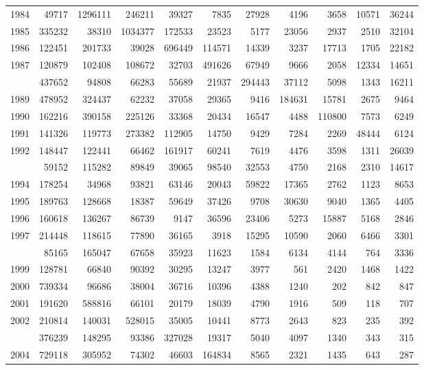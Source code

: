 \documentclass[
]{article}
\begin{document}
\begin{longtable}[t]{lrrrrrrrrrr}
1984 & 49717 & 1296111 & 246211 & 39327 & 7835 & 27928 & 4196 & 3658 & 10571 & 36244\\
1985 & 335232 & 38310 & 1034377 & 172533 & 23523 & 5177 & 23056 & 2937 & 2510 & 32104\\
1986 & 122451 & 201733 & 39028 & 696449 & 114571 & 14339 & 3237 & 17713 & 1705 & 22182\\
1987 & 120879 & 102408 & 108672 & 32703 & 491626 & 67949 & 9666 & 2058 & 12334 & 14651\\
\addlinespace
1988 & 437652 & 94808 & 66283 & 55689 & 21937 & 294443 & 37112 & 5098 & 1343 & 16211\\
1989 & 478952 & 324437 & 62232 & 37058 & 29365 & 9416 & 184631 & 15781 & 2675 & 9464\\
1990 & 162216 & 390158 & 225126 & 33368 & 20434 & 16547 & 4488 & 110800 & 7573 & 6249\\
1991 & 141326 & 119773 & 273382 & 112905 & 14750 & 9429 & 7284 & 2269 & 48444 & 6124\\
1992 & 148447 & 122441 & 66462 & 161917 & 60241 & 7619 & 4476 & 3598 & 1311 & 26039\\
\addlinespace
1993 & 59152 & 115282 & 89849 & 39065 & 98540 & 32553 & 4750 & 2168 & 2310 & 14617\\
1994 & 178254 & 34968 & 93821 & 63146 & 20043 & 59822 & 17365 & 2762 & 1123 & 8653\\
1995 & 189763 & 128668 & 18387 & 59649 & 37426 & 9708 & 30630 & 9040 & 1365 & 4405\\
1996 & 160618 & 136267 & 86739 & 9147 & 36596 & 23406 & 5273 & 15887 & 5168 & 2846\\
1997 & 214448 & 118615 & 77890 & 36165 & 3918 & 15295 & 10590 & 2060 & 6466 & 3301\\
\addlinespace
1998 & 85165 & 165047 & 67658 & 35923 & 11623 & 1584 & 6134 & 4144 & 764 & 3336\\
1999 & 128781 & 66840 & 90392 & 30295 & 13247 & 3977 & 561 & 2420 & 1468 & 1422\\
2000 & 739334 & 96686 & 38004 & 36716 & 10396 & 4388 & 1240 & 202 & 842 & 847\\
2001 & 191620 & 588816 & 66101 & 20179 & 18039 & 4790 & 1916 & 509 & 118 & 707\\
2002 & 210814 & 140031 & 528015 & 35005 & 10441 & 8773 & 2643 & 823 & 235 & 392\\
\addlinespace
2003 & 376239 & 148295 & 93386 & 327028 & 19317 & 5040 & 4097 & 1340 & 343 & 315\\
2004 & 729118 & 305952 & 74302 & 46603 & 164834 & 8565 & 2321 & 1435 & 643 & 287\\

\end{longtable}
\end{document}
